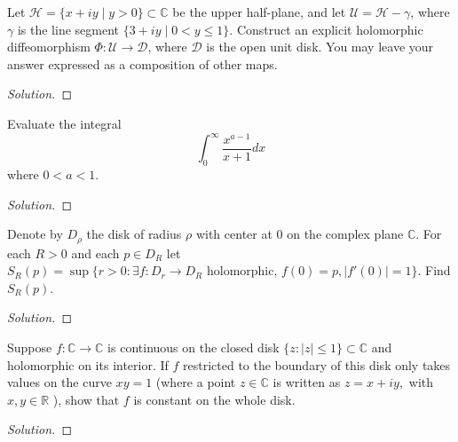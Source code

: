 \documentclass[10pt]{article}
\newenvironment{soln}{\begin{proof}[Solution]}{\end{proof}}
\providecommand{\smabs}[1]{\lvert #1\rvert}
\begin{document}
\begin{problem}
[2020 J-II-3]
Let $\mathcal{H}=\{x+i y \mid y >0\} \subset \mathbb{C}$ be the upper half-plane, and let $\mathcal{U}=\mathcal{H}-\gamma$, where $\gamma$ is the line segment $\{3+i y \mid 0< y \leq 1\}$. Construct an explicit holomorphic diffeomorphism $\Phi: \mathcal{U} \rightarrow \mathcal{D}$, where $\mathcal{D}$ is the open unit disk. You may leave your answer expressed as a composition of other maps.
\end{problem}

\begin{soln}

\end{soln}



\begin{problem}
[2019 J-I-2]
Evaluate the integral
$$
\int_0^{\infty} \frac{x^{a-1}}{x+1} d x
$$
where $0< a<1$.
\end{problem}

\begin{soln}

\end{soln}



\begin{problem}
[2019 J-II-3]
Denote by $D_\rho$ the disk of radius $\rho$ with center at 0 on the complex plane $\mathbb{C}$. For each $R>0$ and each $p \in D_R$ let
$S_R(p) = \sup\{r > 0 : \exists f\colon D_r\to D_R\text{ holomorphic, }
f(0) = p, \smabs{f'(0)} = 1\}$.
Find $S_R(p)$.
\end{problem}

\begin{soln}

\end{soln}



\begin{problem}
[2019 A-II-1]
Suppose $f: \mathbb{C} \rightarrow \mathbb{C}$ is continuous on the closed disk $\{z:|z| \leq 1\} \subset \mathbb{C}$ and holomorphic on its interior. If $f$ restricted to the boundary of this disk only takes values on the curve $x y=1$ (where a point $z \in \mathbb{C}$ is written as $z=x+i y,$ with $x, y \in \mathbb{R}$ ), show that $f$ is constant on the whole disk.
\end{problem}

\begin{soln}

\end{soln}
\end{document}

